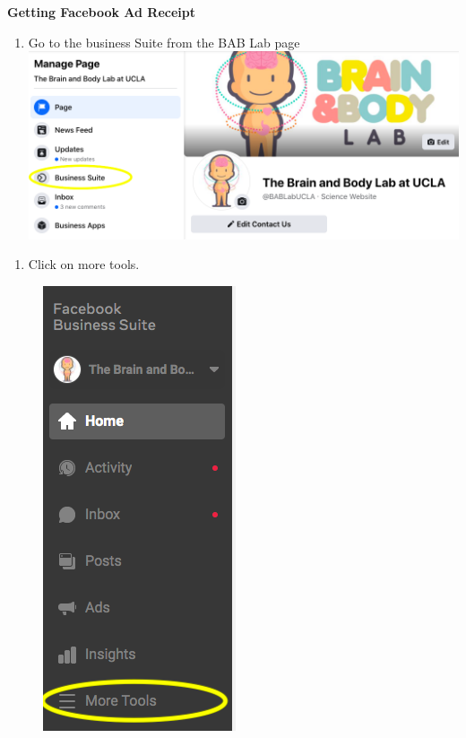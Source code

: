 \documentclass[]{book}
\providecommand{\tightlist}{%
  \setlength{\itemsep}{0pt}\setlength{\parskip}{0pt}}
\begin{document}
\textbf{Getting Facebook Ad Receipt}

\begin{enumerate}
\def\labelenumi{\arabic{enumi})}
\tightlist
\item
  Go to the business Suite from the BAB Lab page
  \includegraphics{images/lab_protocols/fb_pay/pay1.png}
\end{enumerate}

\begin{enumerate}
\def\labelenumi{\arabic{enumi}.}
\setcounter{enumi}{1}
\tightlist
\item
  Click on more tools.
\end{enumerate}

\begin{figure}
\centering
\includegraphics{images/lab_protocols/fb_pay/pay2.png}
\caption{}
\end{figure}
\end{document}
